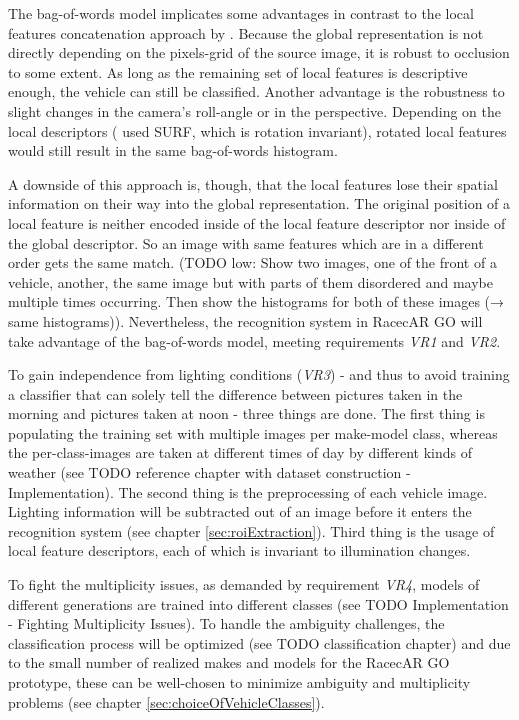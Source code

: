 The bag-of-words model implicates some advantages in contrast to the local features concatenation approach by \citeauthor{petrovic2004analysis}. Because the global representation is not directly depending on the pixels-grid of the source image, it is robust to occlusion to some extent. As long as the remaining set of local features is descriptive enough, the vehicle can still be classified. Another advantage is the robustness to slight changes in the camera's roll-angle or in the perspective. Depending on the local descriptors (\citeauthor{siddiqui2015robust} used SURF, which is rotation invariant), rotated local features would still result in the same bag-of-words histogram.

A downside of this approach is, though, that the local features lose their spatial information on their way into the global representation. The original position of a local feature is neither encoded inside of the local feature descriptor nor inside of the global descriptor. So an image with same features which are in a different order gets the same match. (TODO low: Show two images, one of the front of a vehicle, another, the same image but with parts of them disordered and maybe multiple times occurring. Then show the histograms for both of these images (→ same histograms)). Nevertheless, the recognition system in RacecAR GO will take advantage of the bag-of-words model, meeting requirements \emph{VR1} and \emph{VR2}.

To gain independence from lighting conditions (\emph{VR3}) - and thus to avoid training a classifier that can solely tell the difference between pictures taken in the morning and pictures taken at noon - three things are done. The first thing is populating the training set with multiple images per make-model class, whereas the per-class-images are taken at different times of day by different kinds of weather (see TODO reference chapter with dataset construction - Implementation). The second thing is the preprocessing of each vehicle image. Lighting information will be subtracted out of an image before it enters the recognition system (see chapter \ref{sec:roiExtraction}). Third thing is the usage of local feature descriptors, each of which is invariant to illumination changes.

To fight the multiplicity issues, as demanded by requirement \emph{VR4}, models of different generations are trained into different classes (see TODO Implementation - Fighting Multiplicity Issues). To handle the ambiguity challenges, the classification process will be optimized (see TODO classification chapter) and due to the small number of realized makes and models for the RacecAR GO prototype, these can be well-chosen to minimize ambiguity and multiplicity problems (see chapter \ref{sec:choiceOfVehicleClasses}).

